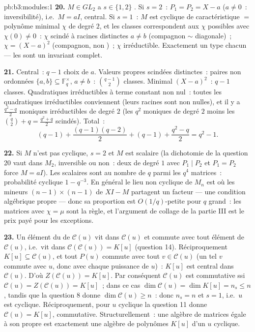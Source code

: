 \begin{solution}{pb:b3:modules:1}
\textbf{20.} $M \in GL_2$ a $s \in \{1, 2\}$ . Si $s = 2$~: $P_1 = P_2 = X - a$ ($a \neq 0$~:
inversibilité), i.e.\ $M = aI$, central. Si $s = 1$~: $M$ est
cyclique de caractéristique $=$ polynôme minimal $\chi$ de
degré $2$, et les classes correspondent aux $\chi$ possibles
avec $\chi(0) \neq 0$~: $\chi$ scindé à racines distinctes $a
\neq b$ (compagnon $\sim$ diagonale)~; $\chi = (X - a)^2$
(compagnon, non )~; $\chi$ irréductible.
Exactement un type chacun --- les  sont un
invariant complet.

\textbf{21.} Central~: $q - 1$ choix de $a$. Valeurs propres
scindées distinctes~: paires non ordonnées $\{a, b\} \subseteq
\mathbb F_q^\times$, $a \neq b$~: $\binom{q-1}2$ classes.
Minimal $(X-a)^2$~: $q - 1$ classes. Quadratiques irréductibles
à terme constant non nul~: toutes les quadratiques
irréductibles conviennent (leurs racines sont non nulles), et
il y a $\frac{q^2 - q}2$ moniques irréductibles de degré $2$
(les $q^2$ moniques de degré $2$ moins les $\binom q2 + q =
\frac{q^2+q}2$ scindés). Total~:
\[
(q - 1) + \frac{(q-1)(q-2)}2 + (q - 1) + \frac{q^2 - q}2
= q^2 - 1 .
\]

\textbf{22.} Si $M$ n'est pas cyclique, $s = 2$ et $M$ est
scalaire (la dichotomie de la question 20 vaut dans $M_2$,
inversible ou non~: deux  de degré $1$ avec
$P_1 \mid P_2$ et $P_1 = P_2$ force $M = aI$). Les scalaires
sont au nombre de $q$ parmi les $q^4$ matrices~: probabilité
cyclique $1 - q^{-3}$. En général le lieu non cyclique de $M_n$
est où les mineurs $(n-1)\times(n-1)$ de $XI - M$ partagent un
facteur --- une condition algébrique propre --- donc sa
proportion est $O(1/q)$-petite pour $q$ grand~: les matrices
avec $\chi = \mu$ sont la règle, et l'argument de collage de la
partie III est le prix payé pour les exceptions.

\textbf{23.} Un élément du  de $\mathcal C(u)$ vit dans
$\mathcal C(u)$ et commute avec tout élément de $\mathcal
C(u)$, i.e.\ vit dans $\mathcal C(\mathcal C(u)) = K[u]$
(question 14). Réciproquement $K[u] \subseteq \mathcal C(u)$,
et tout $P(u)$ commute avec tout $v \in \mathcal C(u)$ (un tel
$v$ commute avec $u$, donc avec chaque puissance de $u$)~:
$K[u]$ est central dans $\mathcal C(u)$. D'où $Z(\mathcal
C(u)) = K[u]$. Par conséquent $\mathcal C(u)$ est commutative
ssi $\mathcal C(u) = Z(\mathcal C(u)) = K[u]$~; dans ce cas
$\dim\mathcal C(u) = \dim K[u] = n_s \leq n$, tandis que la
question 8 donne $\dim\mathcal C(u) \geq n$~: donc $n_s = n$ et
$s = 1$, i.e.\ $u$ est cyclique. Réciproquement, pour $u$
cyclique la question 11 donne $\mathcal C(u) = K[u]$,
commutative. Structurellement~: une algèbre de matrices égale
à son propre  est exactement une algèbre de polynômes
$K[u]$ d'un $u$ cyclique.


\end{solution}
